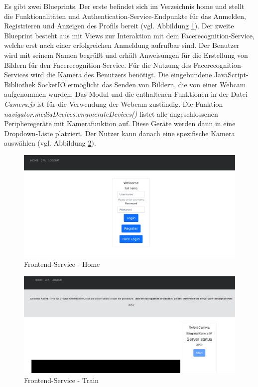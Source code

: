 Es gibt zwei Blueprints. 
Der erste befindet sich im Verzeichnis home und stellt die Funktionalitäten und Authentication-Service-Endpunkte für das Anmelden, Registrieren und Anzeigen des Profils bereit (vgl. Abbildung \ref{fig:kubevision_home}).
Der zweite Blueprint besteht aus mit Views zur Interaktion mit dem Facerecognition-Service, welche erst nach einer erfolgreichen Anmeldung aufrufbar sind.
Der Benutzer wird mit seinem Namen begrüßt und erhält Anweisungen für die Erstellung von Bildern für den Facerecognition-Service.
Für die Nutzung des Facerecognition-Services wird die Kamera des Benutzers benötigt.
Die eingebundene JavaScript-Bibliothek SocketIO ermöglicht das Senden von Bildern, die von einer Webcam aufgenommen wurden.
Das Modul und die enthaltenen Funktionen in der Datei \textit{Camera.js} ist für die Verwendung der Webcam zuständig.
Die Funktion \textit{navigator.mediaDevices.enumerateDevices()} listet alle angeschlossenen Peripheregeräte mit Kamerafunktion auf.
Diese Geräte werden dann in eine Dropdown-Liste platziert.
Der Nutzer kann danach eine spezifische Kamera auswählen (vgl. Abbildung \ref{fig:kubevision_train}).

\begin{figure}[!htb]
  \centering
  \includegraphics[width=1.0\columnwidth]{images/kubevision_home.png}
  \caption{Frontend-Service - Home}
  \label{fig:kubevision_home}
\end{figure}



\begin{figure}[!htb]
  \centering
  \includegraphics[width=1.0\columnwidth]{images/Frontend-Service-train.png}
  \caption{Frontend-Service - Train}
  \label{fig:kubevision_train}
\end{figure}



